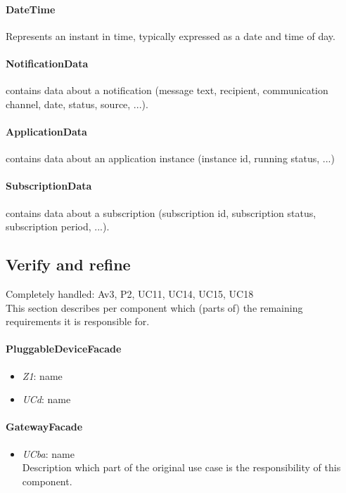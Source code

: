     \paragraph{DateTime} Represents an instant in time, typically expressed as a date and time of day.

    \paragraph{NotificationData} contains data about a notification (message text, recipient,
                                 communication channel, date, status, source, ...).

    \paragraph{ApplicationData} contains data about an application instance (instance id, running status, ...)
    \paragraph{SubscriptionData} contains data about a subscription (subscription id, subscription status,
                                 subscription period, ...).


\subsection{Verify and refine}
    Completely handled: Av3, P2, UC11, UC14, UC15, UC18 \\

    This section describes per component which (parts of) the remaining
    requirements it is responsible for.

    \paragraph{PluggableDeviceFacade}
        \begin{itemize}
        	\item \emph{Z1}: name
        	\item \emph{UCd}: name
        \end{itemize}

    \paragraph{GatewayFacade}
        \begin{itemize}
        	\item \emph{UCba}: name\\Description which part of the original use case is
        	the responsibility of this component.
        \end{itemize}

